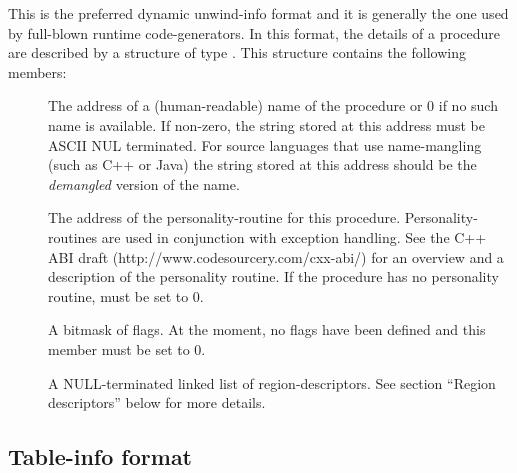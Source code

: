 \documentclass{article}
\begin{document}
This is the preferred dynamic unwind-info format and it is generally
the one used by full-blown runtime code-generators.  In this format,
the details of a procedure are described by a structure of type
.  This structure contains the following
members:
\begin{description}

\item[ ] The address of a
  (human-readable) name of the procedure or 0 if no such name is
  available.  If non-zero, the string stored at this address must be
  ASCII NUL terminated.  For source languages that use name-mangling
  (such as C++ or Java) the string stored at this address should be
  the \emph{demangled} version of the name.

\item[ ] The address of the
  personality-routine for this procedure.  Personality-routines are
  used in conjunction with exception handling.  See the C++ ABI draft
  (http://www.codesourcery.com/cxx-abi/) for an overview and a
  description of the personality routine.  If the procedure has no
  personality routine,  must be set to 0.

\item[ ] A bitmask of flags.  At the
  moment, no flags have been defined and this member must be
  set to 0.

\item[] A NULL-terminated
  linked list of region-descriptors.  See section ``Region
  descriptors'' below for more details.

\end{description}

\subsection{Table-info format}
\end{document}
